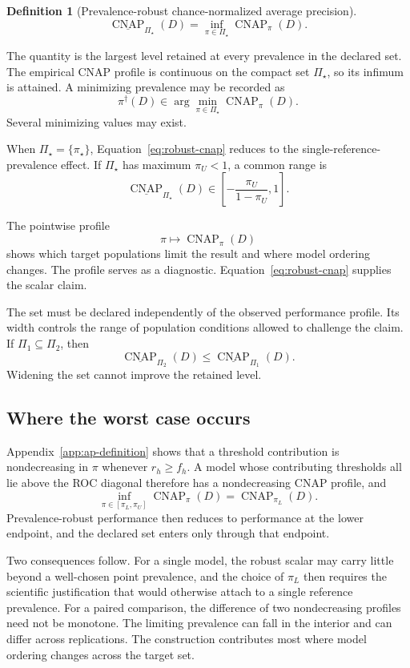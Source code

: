 \documentclass[11pt]{article}
\newcommand{\CNAP}{\operatorname{CNAP}}
\newcommand{\PSet}{\Pi_\star}
\newcommand{\RobCNAP}{\underline{\CNAP}_{\PSet}}
\newtheorem{definition}{Definition}
\theoremstyle{remark}
\begin{document}
\begin{definition}[Prevalence-robust chance-normalized average precision]
\begin{equation}
\RobCNAP(D)
=
\inf_{\pi\in\PSet}\CNAP_\pi(D).
\label{eq:robust-cnap}
\end{equation}
\end{definition}

The quantity is the largest level retained at every prevalence in the declared set. The empirical CNAP profile is continuous on the compact set $\PSet$, so its infimum is attained. A minimizing prevalence may be recorded as
\[
\pi^\dagger(D)
\in
\arg\min_{\pi\in\PSet}\CNAP_\pi(D).
\]
Several minimizing values may exist.

When $\PSet=\{\pi_\star\}$, Equation~\eqref{eq:robust-cnap} reduces to the single-reference-prevalence effect. If $\PSet$ has maximum $\pi_U<1$, a common range is
\[
\RobCNAP(D)
\in
\left[-\frac{\pi_U}{1-\pi_U},1\right].
\]

The pointwise profile
\[
\pi\longmapsto\CNAP_\pi(D)
\]
shows which target populations limit the result and where model ordering changes. The profile serves as a diagnostic. Equation~\eqref{eq:robust-cnap} supplies the scalar claim.

The set must be declared independently of the observed performance profile. Its width controls the range of population conditions allowed to challenge the claim. If $\Pi_1\subseteq\Pi_2$, then
\[
\underline{\CNAP}_{\Pi_2}(D)
\leq
\underline{\CNAP}_{\Pi_1}(D).
\]
Widening the set cannot improve the retained level.

\subsection{Where the worst case occurs}
\label{sec:worst-case}

Appendix~\ref{app:ap-definition} shows that a threshold contribution is nondecreasing in $\pi$ whenever $r_h\geq f_h$. A model whose contributing thresholds all lie above the ROC diagonal therefore has a nondecreasing CNAP profile, and
\[
\inf_{\pi\in[\pi_L,\pi_U]}\CNAP_\pi(D)
=
\CNAP_{\pi_L}(D).
\]
Prevalence-robust performance then reduces to performance at the lower endpoint, and the declared set enters only through that endpoint.

Two consequences follow. For a single model, the robust scalar may carry little beyond a well-chosen point prevalence, and the choice of $\pi_L$ then requires the scientific justification that would otherwise attach to a single reference prevalence. For a paired comparison, the difference of two nondecreasing profiles need not be monotone. The limiting prevalence can fall in the interior and can differ across replications. The construction contributes most where model ordering changes across the target set.
\end{document}
